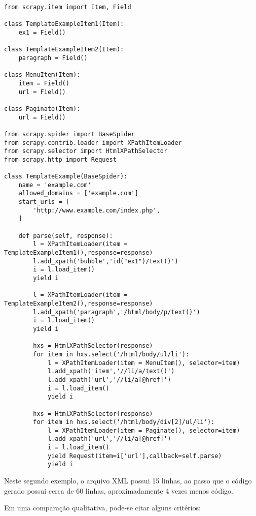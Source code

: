 \begin{lstlisting}
from scrapy.item import Item, Field

class TemplateExampleItem1(Item):
    ex1 = Field()

class TemplateExampleItem2(Item):
    paragraph = Field()
    
class MenuItem(Item):
    item = Field()
    url = Field()
    
class Paginate(Item):
    url = Field()

from scrapy.spider import BaseSpider
from scrapy.contrib.loader import XPathItemLoader
from scrapy.selector import HtmlXPathSelector
from scrapy.http import Request

class TemplateExample(BaseSpider):
    name = 'example.com'
    allowed_domains = ['example.com']
    start_urls = [
        'http://www.example.com/index.php',
    ]

    def parse(self, response):
        l = XPathItemLoader(item = TemplateExampleItem1(),response=response)
        l.add_xpath('bubble','id("ex1")/text()') 
        i = l.load_item()
        yield i
        
        l = XPathItemLoader(item = TemplateExampleItem2(),response=response)
        l.add_xpath('paragraph','/html/body/p/text()') 
        i = l.load_item()
        yield i
        
        hxs = HtmlXPathSelector(response)
        for item in hxs.select('/html/body/ul/li'):
            l = XPathItemLoader(item = MenuItem(), selector=item)
            l.add_xpath('item','//li/a/text()') 
            l.add_xpath('url','//li/a[@href]') 
            i = l.load_item()
            yield i
                        
        hxs = HtmlXPathSelector(response)
        for item in hxs.select('/html/body/div[2]/ul/li'):
            l = XPathItemLoader(item = Paginate(), selector=item)
            l.add_xpath('url','//li/a[@href]') 
            i = l.load_item()
            yield Request(item=i['url'],callback=self.parse)
            yield i
\end{lstlisting}

Neste segundo exemplo, o arquivo XML possui 15 linhas, ao passo que o código gerado possui cerca de 60 linhas, aproximadamente 4 vezes menos código.

Em uma comparação qualitativa, pode-se citar alguns critérios:

